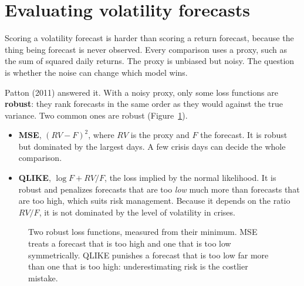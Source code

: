 \section{Evaluating volatility forecasts}
\label{sec:14-eval}

Scoring a volatility forecast is harder than scoring a return forecast, because the thing being forecast is never observed. Every comparison uses a proxy, such as the sum of squared daily returns. The proxy is unbiased but noisy. The question is whether the noise can change which model wins.

Patton (2011) answered it. With a noisy proxy, only some loss functions are \textbf{robust}: they rank forecasts in the same order as they would against the true variance. Two common ones are robust (Figure~\ref{fig:14-qlike}).

\begin{itemize}
  \item \textbf{MSE}, $(RV - F)^2$, where $RV$ is the proxy and $F$ the forecast. It is robust but dominated by the largest days. A few crisis days can decide the whole comparison.
  \item \textbf{QLIKE}, $\log F + RV/F$, the loss implied by the normal likelihood. It is robust and penalizes forecasts that are too \emph{low} much more than forecasts that are too high, which suits risk management. Because it depends on the ratio $RV/F$, it is not dominated by the level of volatility in crises.
\end{itemize}

\begin{figure}[htbp]
\centering
{}
\caption{Two robust loss functions, measured from their minimum. MSE treats a forecast that is too high and one that is too low symmetrically. QLIKE punishes a forecast that is too low far more than one that is too high: underestimating risk is the costlier mistake.}
\label{fig:14-qlike}
\end{figure}


